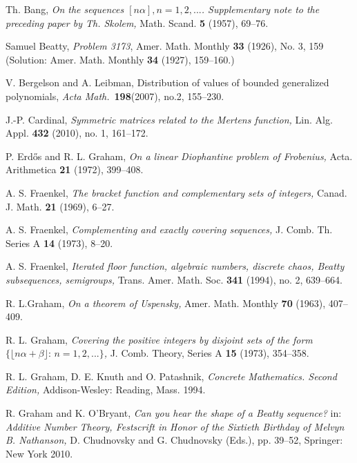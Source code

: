 \documentclass[12pt,letterpaper, reqno]{amsart}
\theoremstyle{definition}
\theoremstyle{remark}
\begin{document}
\begin{thebibliography}{99}

Th. Bang,
\emph{On the sequences $[n \alpha], n=1, 2, ...$.
Supplementary note to the preceding paper by Th. Skolem,}
Math. Scand. {\bf 5}  (1957), 69--76.

Samuel Beatty, {\em Problem 3173}, Amer. Math. Monthly
{\bf 33} (1926), No. 3, 159
(Solution: Amer. Math. Monthly {\bf 34} (1927), 159--160.) 

V. Bergelson and A. Leibman,
Distribution of values of bounded generalized polynomials,
\emph{Acta Math.}\ {\bf 198}(2007), no.2,  155--230.

J.-P. Cardinal,
\emph{Symmetric matrices related to the Mertens function,}
Lin. Alg. Appl. {\bf 432} (2010), no. 1, 161--172.
 
 
P. Erd\H{o}s and R. L. Graham,
\emph{On a linear Diophantine problem of Frobenius,}
Acta. Arithmetica {\bf 21} (1972), 399--408.
 
A. S. Fraenkel,
\emph{The bracket function and complementary sets of integers,}
Canad. J. Math. {\bf 21} (1969), 6--27.
 
A. S. Fraenkel,
\emph{Complementing and exactly covering sequences,}
J. Comb. Th. Series A {\bf 14} (1973), 8--20.
 
 A. S. Fraenkel,
\emph{Iterated floor function, algebraic numbers, discrete chaos,
 Beatty subsequences, semigroups,}
 Trans. Amer. Math. Soc. {\bf 341} (1994), no. 2, 639--664.
 
R. L.Graham,
\emph{On a theorem of Uspensky,}
Amer. Math. Monthly {\bf 70} (1963), 407--409.
 
 R. L. Graham,
 \emph{Covering the positive integers by disjoint sets
 of the form $\{ \lfloor n \alpha + \beta \rfloor: \, n=1, 2,...\}$,}
 J. Comb. Theory, Series A {\bf 15} (1973), 354--358.

R. L. Graham, D. E. Knuth and O. Patashnik,
\emph{Concrete Mathematics. Second Edition,}
Addison-Wesley: Reading, Mass. 1994.



R. Graham and K. O'Bryant,
\emph{Can you hear the shape of a Beatty sequence?}
in: {\em Additive Number Theory, Festscrift in Honor of the Sixtieth Birthday
of Melvyn B. Nathanson,} D. Chudnovsky and G. Chudnovsky (Eds.),
pp. 39--52, Springer: New York 2010. 
 

\end{thebibliography}
\end{document}
